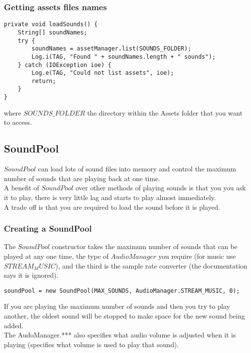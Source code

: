 \documentclass[]{article}
\begin{document}
\subsubsection{Getting assets files names}
\begin{lstlisting}
private void loadSounds() {
	String[] soundNames;
	try {
		soundNames = assetManager.list(SOUNDS_FOLDER);
		Log.i(TAG, "Found " + soundNames.length + " sounds");
	} catch (IOException ioe) {
		Log.e(TAG, "Could not list assets", ioe);
		return;
	}
}
\end{lstlisting}
where $SOUNDS\_FOLDER$ the directory within the Assets folder that you want to access.

\subsection{SoundPool}
$SoundPool$ can load lots of sound files into memory and control the maximum number of sounds that are playing back at one time.
\\
A benefit of $SoundPool$ over other methods of playing sounds is that you you ask it to play, there is very little lag and starts to play almost immediately.
\\
A trade off is that you are required to load the sound before it is played.
\subsubsection{Creating a SoundPool}
The $SoundPool$ constructor takes the maximum number of sounds that can be played at any one time, the type of $AudioManager$ you require (for music use $STREAM_MUSIC$), and the third is the sample rate converter (the documentation says it is ignored).
\begin{lstlisting}
soundPool = new SoundPool(MAX_SOUNDS, AudioManager.STREAM_MUSIC, 0);
\end{lstlisting}
If you are playing the maximum number of sounds and then you try to play another, the oldest sound will be stopped to make space for the new sound being added.
\\
The AudoManager.*** also specifies what audio volume is adjusted when it is playing (specifies what volume is used to play that sound).
\end{document}
